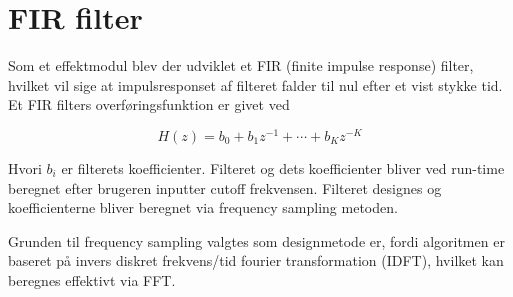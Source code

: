 


\section{FIR filter}
Som et effektmodul blev der udviklet et FIR (finite impulse response) filter, hvilket vil sige at impulsresponset af filteret falder til nul efter et vist stykke tid.\newline
Et FIR filters overføringsfunktion er givet ved

\begin{equation}
H(z) = b_0 + b_1z^{-1} + \cdots + b_Kz^{-K}
\end{equation}

Hvori $b_i$ er filterets koefficienter.\cite[p.218]{Tan2013}\newline
Filteret og dets koefficienter bliver ved run-time beregnet efter brugeren inputter cutoff frekvensen. Filteret designes og koefficienterne bliver beregnet via frequency sampling metoden.

Grunden til frequency sampling valgtes som designmetode er, fordi algoritmen er baseret på invers diskret frekvens/tid fourier transformation (IDFT), hvilket kan beregnes effektivt via FFT.\newline
